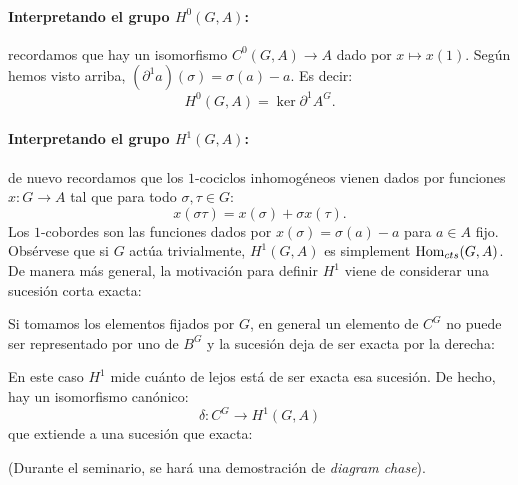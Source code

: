 \documentclass[a4paper,12pt, leqno]{report}
\begin{document}
\paragraph*{Interpretando el grupo $H^0(G,A)$:} recordamos que hay un isomorfismo $C^0(G,A)\rightarrow A$ dado por $x\mapsto x(1)$. Según hemos visto arriba, $(\partial^1 a)(\sigma)=\sigma(a)-a$.  Es decir:
\begin{equation*}
H^0(G,A)=\ker \partial^1 A^G.
\end{equation*}
\paragraph*{Interpretando el grupo $H^1(G,A)$:} de nuevo recordamos que los $1$-cociclos inhomogéneos vienen dados por funciones $x: G \rightarrow A$ tal que para todo $\sigma,\tau \in G$:
\begin{equation*}
x(\sigma \tau)=x(\sigma)+\sigma x(\tau).
\end{equation*}
Los $1$-cobordes son las funciones dados por $x(\sigma)=\sigma(a)-a$ para $a\in A$ fijo.  Obsérvese que si $G$ actúa trivialmente, $H^1(G,A)$ es simplement $\mathrm{Hom}_{cts}(G,A)$. De manera más general, la motivación para definir $H^1$ viene de considerar una sucesión corta exacta:
\begin{center}
\end{center}
Si tomamos los elementos fijados por $G$, en general un elemento de $C^G$ no puede ser representado por uno de $B^G$ y la sucesión deja de ser exacta por la derecha:
\begin{center}
\end{center}
En este caso $H^1$ mide cuánto de lejos está de ser exacta esa sucesión. De hecho, hay un isomorfismo canónico:
\begin{equation*}
\delta: C^G \rightarrow H^1(G,A)
\end{equation*} 
que extiende a una sucesión que exacta:
\begin{center}
\end{center}
(Durante el seminario, se hará una demostración de \textit{diagram chase}).
\end{document}
